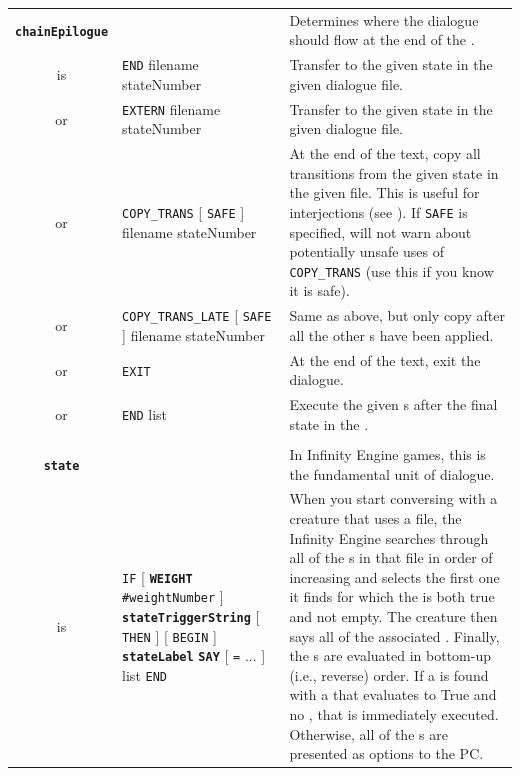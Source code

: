 \documentclass{article}
\def\ttref#1{\ahrefloc{#1}{\tt #1}}
\def\DEFINE#1{{\tt \bf #1}\label{#1}\index{#1}}
\def\t#1{{\tt #1}}
\def\Slist{{\color{red} list }}
\def\Ob{{\color{red} [ }}
\def\Oe{{\color{red} ] }}
\begin{document}
\begin{tabular}{cp{10in}|p{10in}}
\\

\DEFINE{chainEpilogue} & & Determines where the dialogue should flow at the
end of the \ttref{CHAIN}. \\
is & {\tt END} filename stateNumber & Transfer to the given state in the given dialogue file. \\
or & {\tt EXTERN} filename stateNumber & Transfer to the given state in the given dialogue file. \\
or & {\tt COPY_TRANS} \Ob \t{SAFE} \Oe filename stateNumber & At the end of the
\ttref{CHAIN} text, copy all transitions from the given state in the
given file. This is useful for interjections (see \ttref{INTERJECT}). If \t{SAFE} is specified, \ttref{CHAIN} will not warn about potentially unsafe uses of \t{COPY_TRANS} (use this if you know it is safe). \\
or & {\tt COPY_TRANS_LATE} \Ob \t{SAFE} \Oe filename stateNumber & Same as above, but only copy after all the other \ttref{D Action}s have been applied. \\
or & {\tt EXIT} & At the end of the \ttref{CHAIN} text, exit the dialogue.\\
or & {\tt END} \ttref{transition} \Slist & Execute the given \ttref{transition}s
after the final state in the \ttref{CHAIN}. \\

\\

\DEFINE{state} & & In Infinity Engine games, this is the fundamental unit
of dialogue. \\
is & {\tt IF} \Ob \DEFINE{WEIGHT} \t{\#weightNumber} \Oe \DEFINE{stateTriggerString} \Ob {\tt THEN} \Oe
  \Ob {\tt BEGIN} \Oe \DEFINE{stateLabel} \DEFINE{SAY} \ttref{sayText} \Ob \t{=}
  \ttref{sayText} ... \Oe \ttref{transition} \Slist \t{END} &
  When you start conversing with a creature that uses a \ttref{DLG} file, the
  Infinity Engine searches through all of the \ttref{state}s in that file
  in order of increasing \ttref{WEIGHT} and selects the first one it finds
  for which the \ttref{stateTriggerString} is both true and not empty.
  The creature then says all of the associated \ttref{sayText}. Finally,
  the \ttref{transition}s are evaluated in bottom-up (i.e., reverse) order.
  If a \ttref{transition} is found with a \ttref{transTriggerString} that
  evaluates to True and no \ttref{replyText}, that \ttref{transition} is
  immediately executed. Otherwise, all of the \ttref{transition}s are
  presented as options to the PC.


\end{tabular}
\end{document}
